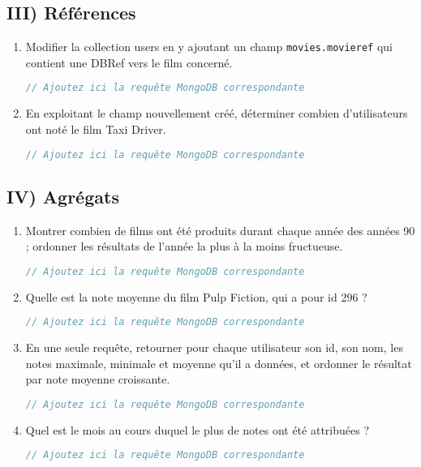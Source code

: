 \documentclass{article}
\begin{document}
\subsection*{III) Références}

\begin{enumerate}
\item Modifier la collection users en y ajoutant un champ \texttt{movies.movieref} qui contient une DBRef vers le film concerné.
\begin{lstlisting}[language=JavaScript]
// Ajoutez ici la requête MongoDB correspondante
\end{lstlisting}

\item En exploitant le champ nouvellement créé, déterminer combien d'utilisateurs ont noté le film Taxi Driver.
\begin{lstlisting}[language=JavaScript]
// Ajoutez ici la requête MongoDB correspondante
\end{lstlisting}

\end{enumerate}

\subsection*{IV) Agrégats}

\begin{enumerate}

\item Montrer combien de films ont été produits durant chaque année des années 90 ; ordonner les résultats de l'année la plus à la moins fructueuse.
\begin{lstlisting}[language=JavaScript]
// Ajoutez ici la requête MongoDB correspondante
\end{lstlisting}

\item Quelle est la note moyenne du film Pulp Fiction, qui a pour id 296 ?
\begin{lstlisting}[language=JavaScript]
// Ajoutez ici la requête MongoDB correspondante
\end{lstlisting}

\item En une seule requête, retourner pour chaque utilisateur son id, son nom, les notes maximale, minimale et moyenne qu'il a données, et ordonner le résultat par note moyenne croissante.
\begin{lstlisting}[language=JavaScript]
// Ajoutez ici la requête MongoDB correspondante
\end{lstlisting}

\item Quel est le mois au cours duquel le plus de notes ont été attribuées ?
\begin{lstlisting}[language=JavaScript]
// Ajoutez ici la requête MongoDB correspondante
\end{lstlisting}

\end{enumerate}
\end{document}
